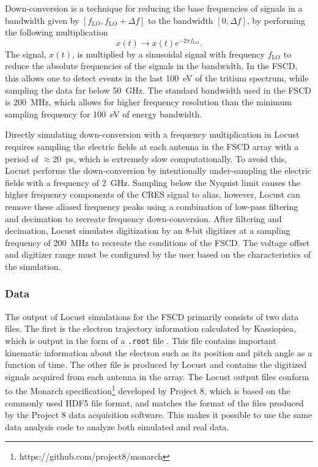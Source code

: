 Down-conversion is a technique for reducing the base frequencies of signals in a bandwidth given by $[f_\textrm{LO},f_\textrm{LO}+\Delta f]$ to the bandwidth $[0, \Delta f]$, by performing the following multiplication
\begin{equation}
    x(t)\rightarrow x(t)e^{-2\pi f_\textrm{LO}}.
\end{equation}
The signal, $x(t)$, is multiplied by a sinusoidal signal with frequency $f_\textrm{LO}$ to reduce the absolute frequencies of the signals in the bandwidth. In the FSCD, this allows one to detect events in the last 100~eV of the tritium spectrum, while sampling the data far below 50~GHz. The standard bandwidth used in the FSCD is 200~MHz, which allows for higher frequency resolution than the minimum sampling frequency for 100~eV of energy bandwidth.

Directly simulating down-conversion with a frequency multiplication in Locust requires sampling the electric fields at each antenna in the FSCD array with a period of $\approx20$~ps, which is extremely slow computationally. To avoid this, Locust performs the down-conversion by intentionally under-sampling the electric fields with a frequency of 2~GHz. Sampling below the Nyquist limit causes the higher frequency components of the CRES signal to alias, however, Locust can remove these aliased frequency peaks using a combination of low-pass filtering and decimation to recreate frequency down-conversion. After filtering and decimation, Locust simulates digitization by an 8-bit digitizer at a sampling frequency of 200~MHz to recreate the conditions of the FSCD. The voltage offset and digitizer range must be configured by the user based on the characteristics of the simulation. 

\subsubsection*{Data}

The output of Locust simulations for the FSCD primarily consists of two data files. The first is the electron trajectory information calculated by Kassiopiea, which is output in the form of a \texttt{.root} file \cite{root}. This file contains important kinematic information about the electron such as its position and pitch angle as a function of time. The other file is produced by Locust and contains the digitized signals acquired from each antenna in the array. The Locust output files conform to the Monarch specification\footnote{https://github.com/project8/monarch} developed by Project 8, which is based on the commonly used HDF5 file format, and matches the format of the files produced by the Project 8 data acquisition software. This makes it possible to use the same data analysis code to analyze both simulated and real data.

